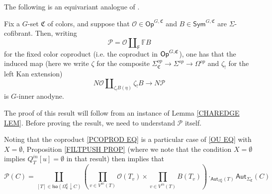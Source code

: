 \documentclass[a4paper,10pt
,draft
]{article}%
\renewcommand{\1}{\eta}%
\begin{document}
The following is an equivariant analogue of \cite[Prop. 3.2]{CM13b}.

\begin{proposition}\label{KEYPR PROP}
Fix a $G$-set $\mathfrak{C}$ of colors,
and suppose that 
$\mathcal{O} \in \mathsf{Op}^{G,\mathfrak{C}}$
and
$B \in \mathsf{Sym}^{G,\mathfrak{C}}$
are
$\Sigma$-cofibrant.
Then, writing
\begin{equation}\label{PCOPROD EQ}
\mathcal{P} = \mathcal{O} \amalg_{\mathsf{F}} \mathbb{F} B
\end{equation}
for the fixed color coproduct (i.e. the coproduct in $\mathsf{Op}^{G, \mathfrak C}$),
one has that the induced map
(here we write $\zeta$ for the composite
$\Sigma_{\mathfrak{C}}^{op} \to \Sigma^{op} \to \Omega^{op}$
and $\zeta_!$ for the left Kan extension)
\begin{equation}\label{ANODYNEMAP EQ}
N \mathcal{O} \amalg_{\zeta_!B (\eta)} \zeta_!B \to N \mathcal{P}
\end{equation}
is $G$-inner anodyne.
%
\end{proposition}


The proof of this result will follow from an instance of 
Lemma \ref{CHAREDGE LEM}. 
Before proving the result, we need to understand $\mathcal{P}$ itself.

Noting that the coproduct \eqref{PCOPROD EQ}
is a particular case of \eqref{OU EQ} with $X=\emptyset$,
Proposition \ref{FILTPUSH PROP}
(where we note that the condition $X=\emptyset$ implies
$Q^{in}_T[u] = \emptyset$ in that result)
then implies that  
\begin{equation}\label{PUSHOPPR EQ}
	\mathcal{P}(C) = 
	\coprod_{
	[T] \in \mathsf{Iso}
	\left( \Omega_{\mathfrak{C}}^a \downarrow C \right)
	}
	\left(
		\prod_{v \in V^{ac}(T)} \mathcal{O}(T_v)
	\times
		\prod_{v \in V^{in}(T)} B(T_v)
	\right)
	\cdot_{\mathsf{Aut}_{\Omega^a_{\mathfrak{C}}}(T)} \mathsf{Aut}_{\Sigma_{\mathfrak{C}}}(C)
\end{equation}
\end{document}

